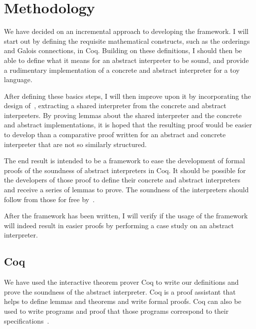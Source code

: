 \section{Methodology}
We have decided on an incremental approach to developing the framework. I will
start out by defining the requisite mathematical constructs, such as the
orderings and Galois connections, in Coq. Building on these definitions, I
should then be able to define what it means for an abstract interpreter to be
sound, and provide a rudimentary implementation of a concrete and abstract
interpreter for a toy language.

After defining these basics steps, I will then improve upon it by incorporating
the design of~\cite{keidel2018compositional}, extracting a shared interpreter
from the concrete and abstract interpreters. By proving lemmas about the
shared interpreter and the concrete and abstract implementations, it is hoped
that the resulting proof would be easier to develop than a comparative proof
written for an abstract and concrete interpreter that are not so similarly
structured.

The end result is intended to be a framework to ease the development of formal
proofs of the soundness of abstract interpreters in Coq. It should be possible
for the developers of those proof to define their concrete and abstract
interpreters and receive a series of lemmas to prove. The soundness of the
interpreters should follow from those for free 
by~\cite{keidel2018compositional}.

After the framework has been written, I will verify if the usage of the
framework will indeed result in easier proofs by performing a case study on an
abstract interpreter.

\subsection{Coq}
We have used the interactive theorem prover Coq to write our definitions and
prove the soundness of the abstract interpreter. Coq is a proof assistant that
helps to define lemmas and theorems and write formal proofs. Coq can also be
used to write programs and proof that those programs correspond to their
specifications~\cite{coqintroduction}.

